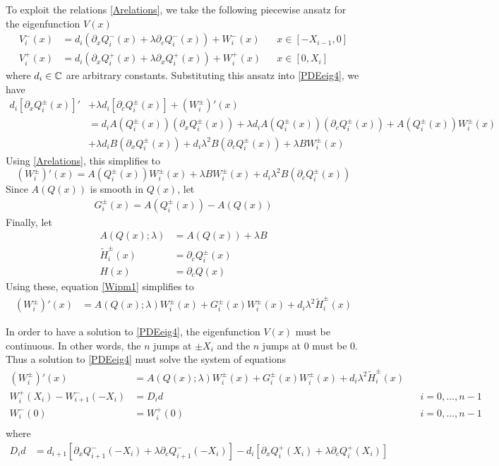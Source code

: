 \documentclass[thesis.tex]{subfiles}
\begin{document}
To exploit the relations \eqref{Arelations}, we take the following piecewise ansatz for the eigenfunction $V(x)$
\begin{equation}\label{Vpiecewise}
\begin{aligned}
V_i^-(x) &= d_i (\partial_x Q_i^-(x) + \lambda \partial_c Q_i^-(x)) + W_i^-(x) && x \in [-X_{i-1}, 0] \\
V_i^+(x) &= d_i (\partial_x Q_i^+(x) + \lambda \partial_x Q_i^+(x)) + W_i^+(x) && x \in [0, X_i] 
\end{aligned}
\end{equation}
where $d_i \in \mathbb{C}$ are arbitrary constants. Substituting this ansatz into \eqref{PDEeig4}, we have
\begin{align*}
d_i [\partial_x Q_i^\pm(x)]' &+ \lambda d_i [\partial_c Q_i^\pm(x)] + (W_i^\pm)'(x) \\
&= d_i A(Q_i^\pm(x))(\partial_x Q_i^\pm(x)) + \lambda d_i A(Q_i^\pm(x)) (\partial_c Q_i^\pm(x)) + A(Q_i^\pm(x)) W_i^\pm(x) \\
&+ \lambda d_i B (\partial_x Q_i^\pm(x)) + d_i \lambda^2 B (\partial_c Q_i^\pm(x)) + \lambda B W_i^\pm(x)
\end{align*}
Using \eqref{Arelations}, this simplifies to
\begin{equation}\label{Wipm1}
(W_i^\pm)'(x) = A(Q_i^\pm(x)) W_i^\pm(x) + \lambda B W_i^\pm(x) + d_i \lambda^2 B (\partial_c Q_i^\pm(x))
\end{equation}
Since $A(Q(x))$ is smooth in $Q(x)$, let 
\begin{align*}
G_i^\pm(x) = A(Q_i^\pm(x)) - A(Q(x))
\end{align*}
Finally, let
\begin{align*}
A(Q(x); \lambda) &= A(Q(x)) + \lambda B \\
\tilde{H}_i^\pm(x) &= \partial_c Q_i^\pm(x) \\ 
H(x) &= \partial_c Q(x)
\end{align*}
Using these, equation \eqref{Wipm1} simplifies to
\begin{align}\label{Wipm2}
(W_i^\pm)'(x) &= A(Q(x); \lambda) W_i^\pm(x) + G_i^\pm(x) W_i^\pm(x) + d_i \lambda^2 \tilde{H}_i^\pm(x)
\end{align}

In order to have a solution to \eqref{PDEeig4}, the eigenfunction $V(x)$ must be continuous. In other words, the $n$ jumps at $\pm X_i$ and the $n$ jumps at $0$ must be 0. Thus a solution to \eqref{PDEeig4} must solve the system of equations
\begin{align*}
(W_i^\pm)'(x) &= A(Q(x); \lambda) W_i^\pm(x) + G_i^\pm(x) W_i^\pm(x) + d_i \lambda^2 \tilde{H}_i^\pm(x) \\
W_i^+(X_i) - W_{i+1}^-(-X_i) &= D_i d && i = 0, \dots, n-1 \\
W_i^-(0) &= W_i^+(0) && i = 0, \dots, n-1  \\
\end{align*}
where
\begin{align}\label{defDid}
D_i d &= d_{i+1}[\partial_x Q_{i+1}^-(-X_i) + \lambda \partial_c Q_{i+1}^-(-X_i)]
- d_i [ \partial_x Q_i^+(X_i) + \lambda \partial_c Q_i^+(X_i) ] \\
\end{align}
\end{document}
